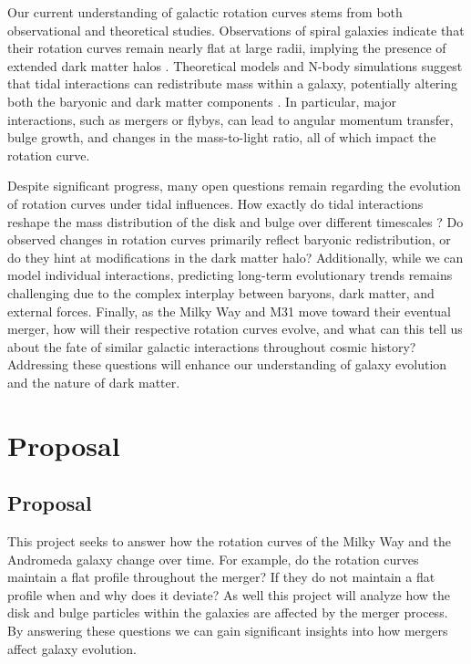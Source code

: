 \documentclass[twocolumn,linenumbers,trackchanges]{aastex7}
\begin{document}
Our current understanding of galactic rotation curves stems from both observational and theoretical studies.
Observations of spiral galaxies indicate that their rotation curves remain nearly flat at large radii, implying the presence of extended dark matter halos \citep{GalacticBulges}.
Theoretical models and N-body simulations suggest that tidal interactions can redistribute mass within a galaxy, potentially altering both the baryonic and dark matter components \citep{Besla2012}.
In particular, major interactions, such as mergers or flybys, can lead to angular momentum transfer, bulge growth, and changes in the mass-to-light ratio, all of which impact the rotation curve.

Despite significant progress, many open questions remain regarding the evolution of rotation curves under tidal influences.
How exactly do tidal interactions reshape the mass distribution of the disk and bulge over different timescales \citep{Kannan2015}?
Do observed changes in rotation curves primarily reflect baryonic redistribution, or do they hint at modifications in the dark matter halo?
Additionally, while we can model individual interactions, predicting long-term evolutionary trends remains challenging due to the complex interplay between baryons, dark matter, and external forces.
Finally, as the Milky Way and M31 move toward their eventual merger, how will their respective rotation curves evolve, and what can this tell us about the fate of similar galactic interactions throughout cosmic history?
Addressing these questions will enhance our understanding of galaxy evolution and the nature of dark matter.

\section{Proposal}
\subsection{Proposal}
This project seeks to answer how the rotation curves of the Milky Way and the Andromeda galaxy change over time.
For example, do the rotation curves maintain a flat profile throughout the merger?
If they do not maintain a flat profile when and why does it deviate?
As well this project will analyze how the disk and bulge particles within the galaxies are affected by the merger process. 
By answering these questions we can gain significant insights into how mergers affect galaxy evolution.
\end{document}
